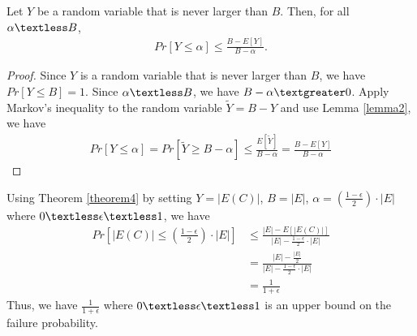 \begin{theorem}\label{theorem4}
Let $Y$ be a random variable that is never larger than $B$. Then, for all $\alpha \textless B$,
\begin{align}
    \nonumber Pr[Y\le\alpha]\le \frac{B-E[Y]}{B-\alpha}.
\end{align}
\end{theorem}
\begin{proof}
Since $Y$ is a random variable that is never larger than $B$, we have $Pr[Y\le B]=1$.
Since $\alpha \textless B$, we have $B-\alpha \textgreater 0$.
Apply Markov's inequality to the random variable $\widetilde{Y}=B-Y$ and use Lemma \ref{lemma2}, we have
\begin{align}
    \nonumber Pr[Y \le \alpha]=Pr[\widetilde{Y}\ge B-\alpha]\le \frac{E[\widetilde{Y}]}{B-\alpha}=\frac{B-E[Y]}{B-\alpha}
\end{align}
\end{proof}
Using Theorem \ref{theorem4} by setting $Y=|E(C)|$, $B=|E|$, $\alpha=(\frac{1-\epsilon}{2})\cdot |E|$ where $0\textless \epsilon\textless 1$, we have
\begin{align}
    \nonumber Pr[|E(C)|\le (\frac{1-\epsilon}{2})\cdot |E|] & \le \frac{|E|-E[|E(C)|]}{|E|-\frac{1-\epsilon}{2}\cdot |E|} \\
    \nonumber &=\frac{|E|-\frac{|E|}{2}}{|E|-\frac{1-\epsilon}{2}\cdot |E|}\\
    \nonumber &=\frac{1}{1+\epsilon}
\end{align}
Thus, we have $\frac{1}{1+\epsilon}$ where $0\textless \epsilon\textless 1$ is an upper bound on the failure probability.